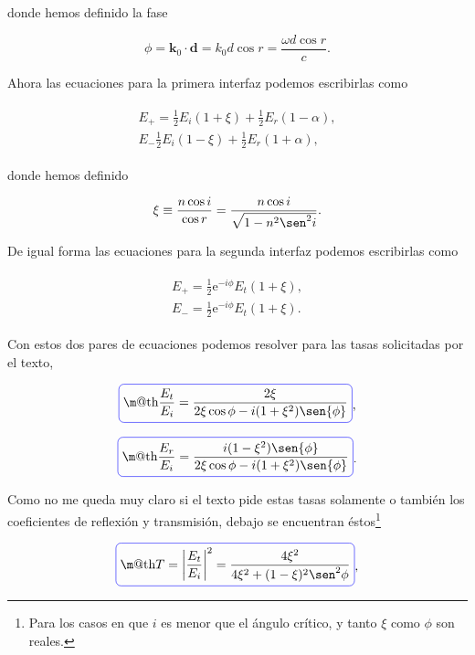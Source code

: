 \documentclass[a4paper,11pt]{article}
\makeatletter
\numberwithin{equation}{section}
\newcommand*{\boxcolor}{blue}
\renewcommand{\boxed}[1]{\textcolor{\boxcolor}{%
\tikz[baseline={([yshift=-1ex]current bounding box.center)}] \node [rectangle, minimum width=1ex,rounded corners,draw] {\normalcolor\m@th$\displaystyle#1$};}}
\newcommand{\euler}{\mathrm{e}}
\makeatother
\begin{document}
donde hemos definido la fase 

\begin{equation}
 \phi = \mathbf{k}_0 \cdot \mathbf{d} = k_0 d \cos{r} = \frac{\omega d \cos{r}}{c}.
\end{equation}

Ahora las ecuaciones para la primera interfaz podemos escribirlas como 

\begin{align}
 \begin{split}
  E_+ = \frac{1}{2}E_i(1 + \xi) + \frac{1}{2}E_r(1 - \alpha), \\
  E_- \frac{1}{2}E_i(1 - \xi) + \frac{1}{2}E_r(1 + \alpha),
 \end{split}
\end{align}

donde hemos definido 

\begin{equation}
 \xi \equiv \frac{n \cos{i}}{\cos{r}} = \frac{n\cos{i}}{\sqrt{1 - n^2\sen^2{i}}}.
\end{equation}

De igual forma las ecuaciones para la segunda interfaz podemos escribirlas como 

\begin{align}
 \begin{split}
  E_+ = \frac{1}{2}\euler^{-i\phi}E_t(1 + \xi), \\
  E_- = \frac{1}{2}\euler^{-i\phi}E_t(1 + \xi).
 \end{split}
\end{align}

Con estos dos pares de ecuaciones podemos resolver para las tasas solicitadas 
por el texto,

\begin{equation}
 \boxed{\frac{E_t}{E_i} = \frac{2\xi}{2\xi\cos{\phi} - i(1 + \xi^2)\sen{\phi}}},
\end{equation}

\begin{equation}
 \boxed{\frac{E_r}{E_i} = \frac{i(1 - \xi^2)\sen{\phi}}{2\xi\cos{\phi} - i(1 + \xi^2)
 \sen{\phi}}}.
\end{equation}

Como no me queda muy claro si el texto pide estas tasas solamente o también los 
coeficientes de reflexión y transmisión, debajo se encuentran éstos\footnote{Para 
los casos en que $i$ es menor que el ángulo crítico, y tanto $\xi$ como $\phi$ son 
reales.}

\begin{equation}
 \boxed{T = \left|\frac{E_t}{E_i} \right|^2 = \frac{4\xi^2}{4\xi^2 + 
 (1 - \xi)^2\sen^2{\phi}}},
\end{equation}
\end{document}
